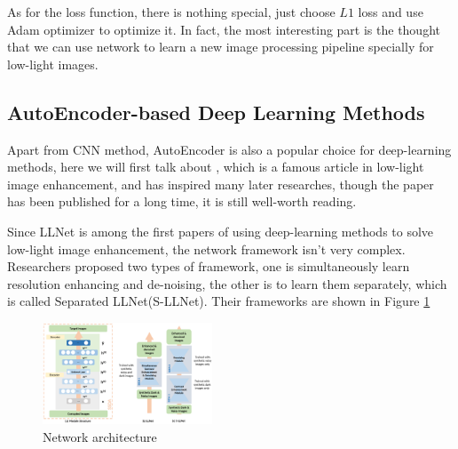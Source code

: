 \documentclass[10pt,twocolumn,letterpaper]{article}
\begin{document}
As for the loss function, there is nothing special, just choose $L1$ loss and use Adam optimizer to optimize it. In fact, the most interesting part is the thought that we can use network to learn a new image processing pipeline specially for low-light images.

\subsection{AutoEncoder-based Deep Learning Methods}
Apart from CNN method, AutoEncoder is also a popular choice for deep-learning methods, here we will first talk about \cite{lore2017llnet}, which is a famous article in low-light image enhancement, and has inspired many later researches, though the paper has been published for a long time, it is still well-worth reading.

Since LLNet is among the first papers of using deep-learning methods to solve low-light image enhancement, the network framework isn't very complex. Researchers proposed two types of framework, one is simultaneously learn resolution enhancing and de-noising, the other is to learn them separately, which is called Separated LLNet(S-LLNet). Their frameworks are shown in Figure \ref{fig:llnet}
\begin{figure}[t]
    \centering
    \includegraphics[width=0.45\textwidth]{latex/llnet.png}
    \caption{Network architecture \cite{lore2017llnet}}
    \label{fig:llnet}
\end{figure} 
\end{document}
